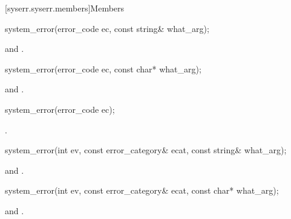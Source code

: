 [syserr.syserr.members]{Members}

%
\begin{itemdecl}
system_error(error_code ec, const string& what_arg);
\end{itemdecl}

\begin{itemdescr}
\pnum
\ensures
{} and\newline
{}.
\end{itemdescr}

%
\begin{itemdecl}
system_error(error_code ec, const char* what_arg);
\end{itemdecl}

\begin{itemdescr}
\pnum
\ensures
{} and
.
\end{itemdescr}

%
\begin{itemdecl}
system_error(error_code ec);
\end{itemdecl}

\begin{itemdescr}
\pnum
\ensures
{}.
\end{itemdescr}

%
\begin{itemdecl}
system_error(int ev, const error_category& ecat, const string& what_arg);
\end{itemdecl}

\begin{itemdescr}
\pnum
\ensures
\raggedright {} and\linebreak
{}.
\end{itemdescr}

%
\begin{itemdecl}
system_error(int ev, const error_category& ecat, const char* what_arg);
\end{itemdecl}

\begin{itemdescr}
\pnum
\ensures
\raggedright {} and\linebreak
{}.
\end{itemdescr}

